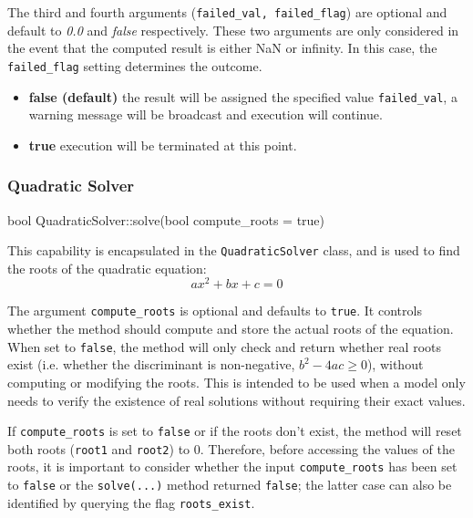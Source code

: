 \documentclass[11pt,fleqn]{report}
\begin{document}
The third and fourth arguments (\texttt{failed\_val, failed\_flag}) are
optional and default to \textit{0.0} and \textit{false} respectively.
These two arguments are only considered in the event that the computed result is
either NaN or infinity.
In this case, the \texttt{failed\_flag} setting determines the outcome.
\begin{itemize}
\item \textbf{false (default)} the result will be assigned the specified
value \texttt{failed\_val}, a warning message will be broadcast and
execution will continue.
\item \textbf{true} execution will be terminated at this point.
\end{itemize}

\subsubsection{Quadratic Solver}
\begin{code}
bool QuadraticSolver::solve(bool compute_roots = true)
\end{code}

This capability is encapsulated in the \texttt{QuadraticSolver} class,
and is used to find the roots of the quadratic equation:
\begin{equation*}
ax^2 + bx + c = 0
\end{equation*}

The argument \texttt{compute\_roots} is optional and defaults to \texttt{true}.
It controls whether the method should compute and store the actual roots of the
equation. When set to \texttt{false}, the method will only check and return whether real
roots exist (i.e. whether the discriminant is non-negative, $b^2 - 4ac \geq 0$), 
without computing or modifying the roots. This is intended to be used
when a model only needs to verify the existence of real solutions without
requiring their exact values. 

If \texttt{compute\_roots} is set to \texttt{false} or if the roots don't exist,
the method will reset both roots (\texttt{root1} and \texttt{root2}) to 0.
Therefore, before accessing the values of the roots, it is important to consider
whether the input \texttt{compute\_roots} has been set to \texttt{false} or the
\texttt{solve(...)} method returned \texttt{false}; the latter case can also be
identified by querying the flag \texttt{roots\_exist}.

\end{document}
